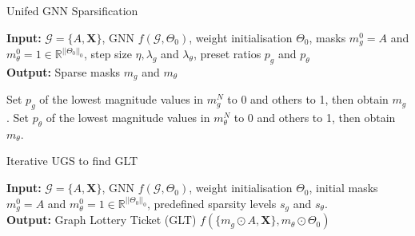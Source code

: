 \documentclass[honours,12pt]{unswthesis}
\newcommand{\R}{\mathbb{R}}
\numberwithin{equation}{section}
\begin{document}
\begin{algorithm}
    \caption{Unifed GNN Sparsification\cite{chen2021unified}}\label{alg:ugs}
    \textbf{Input:}  $\mathcal{G} = \{A, \textbf{X}\}$, GNN $f(\mathcal{G}, \Theta_0)$, weight initialisation $\Theta_0$, masks $m^0_g = A$ and $m^0_\theta = 1 \in \R^{||\Theta_0||_0}$, step size $\eta, \lambda_g$ and $\lambda_\theta$,
    preset ratios $p_g$ and $p_\theta$\\
    \textbf{Output:} Sparse masks $m_g$ and $m_\theta$
    \begin{algorithmic}[1]
        \EndFor
        \State Set $p_g$ of the lowest magnitude values in $m_g^N$ to 0 and others to 1, then obtain $m_g$. 
        \State Set $p_\theta$ of the lowest magnitude values in $m_\theta^N$ to 0 and others to 1, then obtain $m_\theta$. 
    \end{algorithmic}
\end{algorithm}

\begin{algorithm}
    \caption{Iterative UGS to find GLT\cite{chen2021unified}}\label{alg:iterative_ugs}
    \textbf{Input:}  $\mathcal{G} = \{A, \textbf{X}\}$, GNN $f(\mathcal{G}, \Theta_0)$, weight initialisation $\Theta_0$, initial masks $m^0_g = A$ and $m^0_\theta = 1 \in \R^{||\Theta_0||_0}$, predefined sparsity levels $s_g$ and $s_\theta$.\\
    \textbf{Output:} Graph Lottery Ticket (GLT) $f(\{m_g\odot A, \textbf{X}\}, m_\theta\odot\Theta_0)$
    \begin{algorithmic}[1]
        \EndWhile
    \end{algorithmic}
\end{algorithm}
\end{document}
